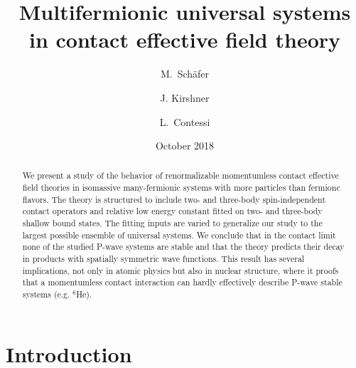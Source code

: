 \documentclass[preprint,12pt]{elsarticle}
\begin{document}
\title{Multifermionic universal systems in contact effective field theory}
\author{M.~Sch{\"a}fer }%
\address{Czech Technical University in Prague, Faculty of Nuclear Sciences 
and Physical Engineering, B\v{r}ehov\'{a} 7, 11519 Prague 1, Czech Republic} 
\author{J. Kirshner } 
\address{Theoretical Physics Division, School of Physics and Astronomy,
The University of Manchester, Manchester, M13 9PL, United Kingdom} 
\author{L.~Contessi } 
\address{Racah Institute of Physics, The Hebrew university, 91904 Jerusalem, 
Israel} 
\address{ESNT, IRFU, CEA, Universite Paris Saclay, F-91191 Gif-sur-Yvette, France} 
\date{October 2018}


\begin{abstract}We present a study of the behavior of renormalizable momentumless contact effective field theories in isomassive many-fermionic systems with more particles than fermionc flavors.
The theory is structured to include two- and three-body spin-independent contact operators and relative low energy constant fitted on two- and three-body shallow bound states.
The fitting inputs are varied to generalize our study to the largest possible ensemble of universal systems.
We conclude that in the contact limit none of the studied P-wave systems are stable and that the theory predicts their decay in products with spatially symmetric wave functions.
This result has several implications, not only in atomic physics but also in nuclear structure, where it proofs that a momentumless contact interaction can hardly effectively describe P-wave stable systems (e.g. $^6$He).
\end{abstract}

\maketitle



\newpage
\section{Introduction}
\end{document}
